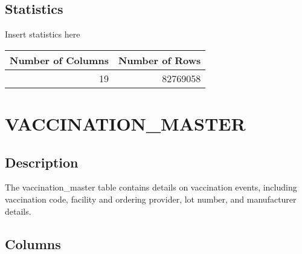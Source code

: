 \documentclass[
  letterpaper,
  DIV=11,
  numbers=noendperiod]{scrreprt}
\begin{document}
\hypertarget{statistics-43}{%
\section*{Statistics}\label{statistics-43}}

Insert statistics here

\begin{longtable}{rr}
\toprule
Number of Columns & Number of Rows \\ 
\midrule
19 & 82769058 \\ 
\bottomrule
\end{longtable}

\hypertarget{vaccination_master}{%
\chapter*{VACCINATION\_MASTER}\label{vaccination_master}}

\hypertarget{description-44}{%
\section*{Description}\label{description-44}}

The vaccination\_master table contains details on vaccination events,
including vaccination code, facility and ordering provider, lot number,
and manufacturer details.

\hypertarget{columns-44}{%
\section*{Columns}\label{columns-44}}
\end{document}
